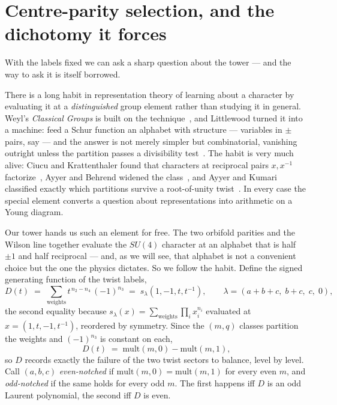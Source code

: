 \documentclass[11pt,a4paper]{article}
\begin{document}
\section{Centre-parity selection, and the dichotomy it forces}\label{sec:dichotomy}
With the labels fixed we can ask a sharp question about the tower --- and the way to ask it
is itself borrowed.

There is a long habit in representation theory of learning about a character by evaluating
it at a \emph{distinguished} group element rather than studying it in general. Weyl's
\emph{Classical Groups} is built on the technique~\cite{Weyl}, and Littlewood turned it into
a machine: feed a Schur function an alphabet with structure --- variables in $\pm$ pairs,
say --- and the answer is not merely simpler but combinatorial, vanishing outright unless
the partition passes a divisibility test~\cite{LittlewoodBook}. The habit is very much
alive: Ciucu and Krattenthaler found that characters at reciprocal pairs
$x,x^{-1}$ factorize~\cite{CiucuKrattenthaler}, Ayyer and Behrend widened the
class~\cite{AyyerBehrend}, and Ayyer and Kumari classified exactly which partitions survive
a root-of-unity twist~\cite{AyyerKumari,Kumari}. In every case the special element converts
a question about representations into arithmetic on a Young diagram.

Our tower hands us such an element for free. The two orbifold parities and the Wilson line
together evaluate the $SU(4)$ character at an alphabet that is half $\pm1$ and half
reciprocal --- and, as we will see, that alphabet is not a convenient choice but the one the
physics dictates. So we follow the habit. Define the signed generating function of the twist
labels,
\begin{equation}\label{eq:D}
D(t)\;=\;\sum_{\text{weights}} t^{\,n_2-n_4}\,(-1)^{n_3}\;=\;s_\lambda\!\left(1,-1,t,t^{-1}\right),
\qquad \lambda=(a{+}b{+}c,\;b{+}c,\;c,\;0),
\end{equation}
the second equality because $s_\lambda(x)=\sum_{\text{weights}}\prod_i x_i^{n_i}$ evaluated
at $x=(1,t,-1,t^{-1})$, reordered by symmetry. Since the $(m,q)$ classes partition the
weights and $(-1)^{n_3}$ is constant on each,
\begin{equation}
[t^m]\,D(t)\;=\;\mathrm{mult}(m,0)-\mathrm{mult}(m,1),
\end{equation}
so $D$ records exactly the failure of the two twist sectors to balance, level by level.
Call $(a,b,c)$ \emph{even-notched} if $\mathrm{mult}(m,0)=\mathrm{mult}(m,1)$ for every even
$m$, and \emph{odd-notched} if the same holds for every odd $m$. The first happens iff $D$ is
an odd Laurent polynomial, the second iff $D$ is even.
\end{document}
